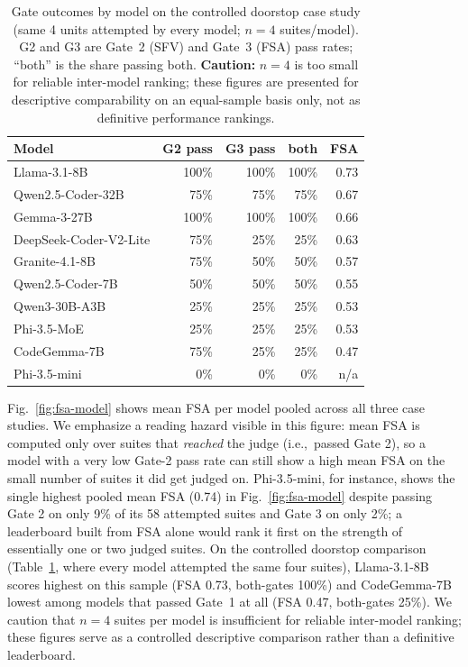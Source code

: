 \documentclass[conference]{IEEEtran}
\newcommand{\ie}{i.e.,\ }
\begin{document}
\begin{table}[t]
\centering
\caption{Gate outcomes by model on the controlled doorstop case study (same
4 units attempted by every model; $n=4$ suites/model). G2 and G3 are Gate~2
(SFV) and Gate~3 (FSA) pass rates; ``both'' is the share passing both.
\textbf{Caution:} $n=4$ is too small for reliable inter-model ranking; these
figures are presented for descriptive comparability on an equal-sample basis
only, not as definitive performance rankings.}
\label{tab:doorstop}
\small
\begin{tabular}{@{}lrrrr@{}}
\toprule
Model & G2 pass & G3 pass & both & FSA \\
\midrule
Llama-3.1-8B & 100\% & 100\% & 100\% & 0.73 \\
Qwen2.5-Coder-32B & 75\% & 75\% & 75\% & 0.67 \\
Gemma-3-27B & 100\% & 100\% & 100\% & 0.66 \\
DeepSeek-Coder-V2-Lite & 75\% & 25\% & 25\% & 0.63 \\
Granite-4.1-8B & 75\% & 50\% & 50\% & 0.57 \\
Qwen2.5-Coder-7B & 50\% & 50\% & 50\% & 0.55 \\
Qwen3-30B-A3B & 25\% & 25\% & 25\% & 0.53 \\
Phi-3.5-MoE & 25\% & 25\% & 25\% & 0.53 \\
CodeGemma-7B & 75\% & 25\% & 25\% & 0.47 \\
Phi-3.5-mini & 0\% & 0\% & 0\% & n/a \\
\bottomrule
\end{tabular}
\end{table}

Fig.~\ref{fig:fsa-model} shows mean FSA per model pooled across all three
case studies. We emphasize a reading hazard visible in this figure: mean FSA
is computed only over suites that \emph{reached} the judge (\ie passed
Gate 2), so a model with a very low Gate-2 pass rate can still show a high
mean FSA on the small number of suites it did get judged on. Phi-3.5-mini,
for instance, shows the single highest pooled mean FSA (0.74) in
Fig.~\ref{fig:fsa-model} despite passing Gate 2 on only 9\% of its 58
attempted suites and Gate 3 on only 2\%; a leaderboard built from FSA
alone would rank it first on the strength of essentially one or two judged
suites. On the controlled doorstop comparison (Table~\ref{tab:doorstop}, where every
model attempted the same four suites), Llama-3.1-8B scores highest on this
sample (FSA 0.73, both-gates 100\%) and CodeGemma-7B lowest among models
that passed Gate~1 at all (FSA 0.47, both-gates 25\%). We caution that
$n=4$ suites per model is insufficient for reliable inter-model ranking;
these figures serve as a controlled descriptive comparison rather than a
definitive leaderboard.
\end{document}
